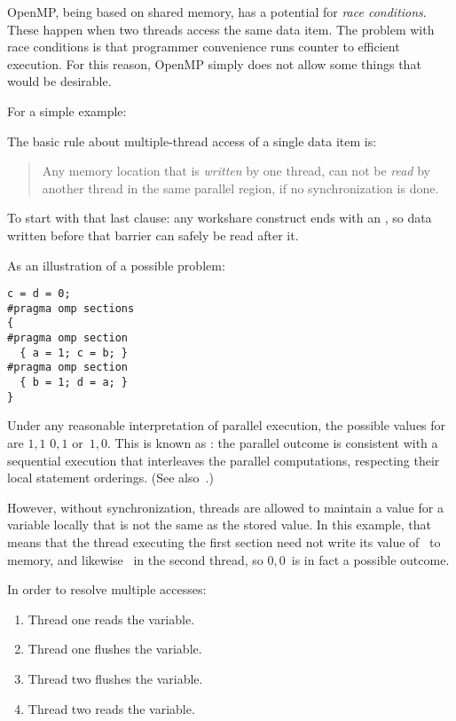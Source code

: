 OpenMP, being based on shared memory, has a potential for \emph{race
  conditions}. These happen when two threads access the same data
item. The problem with race conditions is that programmer convenience
runs counter to efficient execution. For this reason, OpenMP simply
does not allow some things that would be desirable.

For a simple example:

The basic rule about multiple-thread access of a single data item is:
\begin{quote}
  Any memory location that is \emph{written} by one thread, can not be
  \emph{read} by another thread in the same parallel region, if no
  synchronization is done.
\end{quote}

To start with that last clause: any workshare construct ends with an
, so data written before that barrier
can safely be read after it.

As an illustration of a possible problem:
\begin{lstlisting}
c = d = 0;
#pragma omp sections
{
#pragma omp section
  { a = 1; c = b; }
#pragma omp section
  { b = 1; d = a; }
}
\end{lstlisting}
Under any reasonable interpretation of parallel execution,
the possible values for  are $1,1$ $0,1$ or~$1,0$.
This is known as :
the parallel outcome is consistent with a sequential execution that
interleaves the parallel computations, respecting their local statement orderings.
(See also~.)

However, without synchronization, threads are allowed to maintain a value for a
variable locally that is not the same as the stored value. In this
example, that means that the thread executing the first section need
not write its value of~ to memory, and likewise ~in the
second thread, so $0,0$~is in fact a possible outcome.

In order to resolve multiple accesses:
\begin{enumerate}
\item Thread one reads the variable.
\item Thread one flushes the variable.
\item Thread two flushes the variable.
\item Thread two reads the variable.
\end{enumerate}


